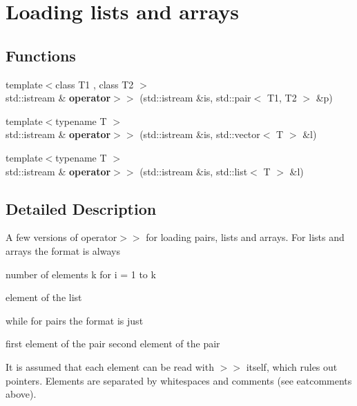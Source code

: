 \hypertarget{group__load__multi__arrays}{}\section{Loading lists and arrays}
\label{group__load__multi__arrays}
\subsection*{Functions}
\begin{DoxyCompactItemize}
\item 
\mbox{\label{group__load__multi__arrays_ga19e330e44c63b5d3bed35e3cb5bf4925}} 
{\footnotesize template$<$class T1 , class T2 $>$ }\\std\+::istream \& {\bfseries operator$>$$>$} (std\+::istream \&is, std\+::pair$<$ T1, T2 $>$ \&p)
\item 
\mbox{\label{group__load__multi__arrays_ga82335d13c5fdf6ef573de2cc86152964}} 
{\footnotesize template$<$typename T $>$ }\\std\+::istream \& {\bfseries operator$>$$>$} (std\+::istream \&is, std\+::vector$<$ T $>$ \&l)
\item 
\mbox{\label{group__load__multi__arrays_ga122a36ac505864a3e3f4ce6b5893b05d}} 
{\footnotesize template$<$typename T $>$ }\\std\+::istream \& {\bfseries operator$>$$>$} (std\+::istream \&is, std\+::list$<$ T $>$ \&l)
\end{DoxyCompactItemize}


\subsection{Detailed Description}
A few versions of operator$>$$>$ for loading pairs, lists and arrays. For lists and arrays the format is always

number of elements k for i = 1 to k
\begin{DoxyItemize}
\item element of the list
\end{DoxyItemize}

while for pairs the format is just

first element of the pair second element of the pair

It is assumed that each element can be read with $>$$>$ itself, which rules out pointers. Elements are separated by whitespaces and comments (see eatcomments above). 